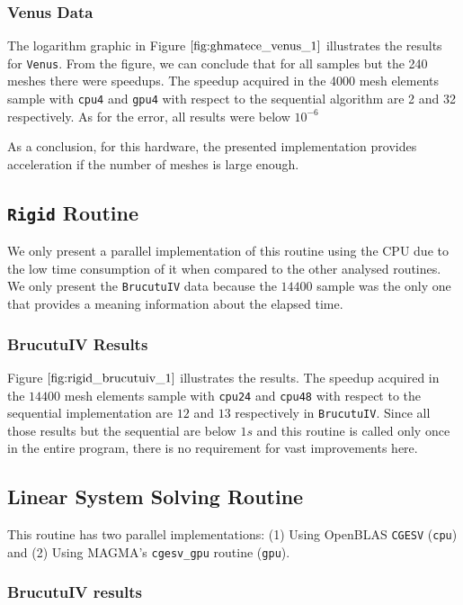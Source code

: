 \subsubsection{Venus Data}

The logarithm graphic in Figure $\ref{fig:ghmatece_venus_1}$ illustrates the results for \texttt{Venus}. 
From the figure, we can conclude that for all samples but the 240 meshes there were speedups. The speedup 
acquired in the 4000 mesh elements sample with \texttt{cpu4} and \texttt{gpu4} with respect to the sequential algorithm are 2 and 32 respectively.
As for the error, all results were below  $10^{-6}$

As a conclusion, for this hardware, the presented implementation provides acceleration if the number of meshes is large enough. 

\subsection{\texttt{Rigid} Routine}

We only present a parallel implementation of this routine using the CPU due to the low time 
consumption of it when compared to the other analysed routines. We only present the \texttt{BrucutuIV} 
data because the $14400$ sample was the only one that provides a meaning information about the elapsed time.

\subsubsection{BrucutuIV Results}

Figure $\ref{fig:rigid_brucutuiv_1}$ illustrates the results. The speedup acquired in the $14400$ mesh elements 
sample with  \texttt{cpu24} and \texttt{cpu{48}} with respect to the sequential implementation are $12$ and $13$ 
respectively in \texttt{BrucutuIV}. 
Since all those results but the sequential are below $1s$ and this routine is called only once in the entire program, 
there is no requirement for vast improvements here.

\subsection{Linear System Solving Routine}

This routine has two parallel implementations: (1) Using OpenBLAS \texttt{CGESV} 
(\texttt{cpu}) and (2) Using MAGMA's \texttt{cgesv\_gpu} routine (\texttt{gpu}). 

\subsubsection{BrucutuIV results}

